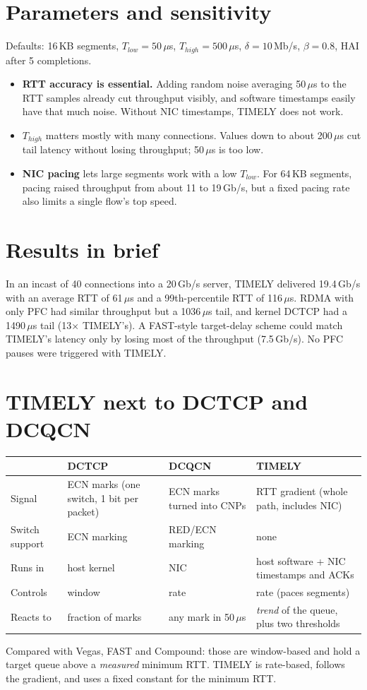 \section{Parameters and sensitivity}
Defaults: 16\,KB segments, $T_{low} = 50\,\mu$s, $T_{high} = 500\,\mu$s, $\delta = 10$\,Mb/s, $\beta = 0.8$, HAI after 5 completions.
\begin{itemize}
  \item \textbf{RTT accuracy is essential.} Adding random noise averaging 50\,$\mu$s to the RTT samples already cut throughput visibly, and software
        timestamps easily have that much noise. Without NIC timestamps, TIMELY does not work.
  \item \textbf{$T_{high}$} matters mostly with many connections. Values down to about 200\,$\mu$s cut tail latency without losing throughput; 50\,$\mu$s
        is too low.
  \item \textbf{NIC pacing} lets large segments work with a low $T_{low}$. For 64\,KB segments, pacing raised throughput from about 11 to 19\,Gb/s, but a
        fixed pacing rate also limits a single flow's top speed.
\end{itemize}

\section{Results in brief}
In an incast of 40 connections into a 20\,Gb/s server, TIMELY delivered 19.4\,Gb/s with an average RTT of 61\,$\mu$s and a 99th-percentile RTT of
116\,$\mu$s. RDMA with only PFC had similar throughput but a 1036\,$\mu$s tail, and kernel DCTCP had a 1490\,$\mu$s tail (13$\times$ TIMELY's). A
FAST-style target-delay scheme could match TIMELY's latency only by losing most of the throughput (7.5\,Gb/s). No PFC pauses were triggered with
TIMELY.

\section{TIMELY next to DCTCP and DCQCN}
\begin{center}
\small
\begin{tabularx}{\linewidth}{@{}lXXX@{}}
\toprule
 & \textbf{DCTCP} & \textbf{DCQCN} & \textbf{TIMELY}\\
\midrule
Signal & ECN marks (one switch, 1 bit per packet) & ECN marks turned into CNPs & RTT gradient (whole path, includes NIC)\\
Switch support & ECN marking & RED/ECN marking & none\\
Runs in & host kernel & NIC & host software + NIC timestamps and ACKs\\
Controls & window & rate & rate (paces segments)\\
Reacts to & fraction of marks & any mark in 50\,$\mu$s & \emph{trend} of the queue, plus two thresholds\\
\bottomrule
\end{tabularx}
\end{center}
Compared with Vegas, FAST and Compound: those are window-based and hold a target queue above a \emph{measured} minimum RTT. TIMELY is rate-based,
follows the gradient, and uses a fixed constant for the minimum RTT.

